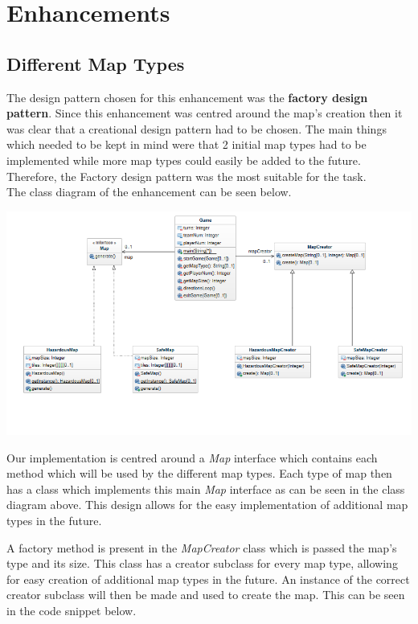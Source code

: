 \documentclass[a4paper,12pt]{extarticle}
\begin{document}
\newpage
\section{Enhancements}
\subsection{Different Map Types}

The design pattern chosen for this enhancement was the \textbf{factory design pattern}. Since this enhancement was centred around the map's creation then it was clear that a creational design pattern had to be chosen. The main things which needed to be kept in mind were that 2 initial map types had to be implemented while more map types could easily be added to the future. Therefore, the Factory design pattern was the most suitable for the task.\\

The class diagram of the enhancement can be seen below.\\

\begin{center}
\includegraphics[width=\textwidth]{Enhancement1CD.png}\\
\end{center}

\newpage

\noindent Our implementation is centred around a \textit{Map} interface which contains each method which will be used by the different map types. Each type of map then has a class which implements this main \textit{Map} interface as can be seen in the class diagram above. This design allows for the easy implementation of additional map types in the future.\par

A factory method is present in the \textit{MapCreator} class which is passed the map's type and its size. This class has a creator subclass for every map type, allowing for easy creation of additional map types in the future. An instance of the correct creator subclass will then be made and used to create the map. This can be seen in the code snippet below.
\end{document}
